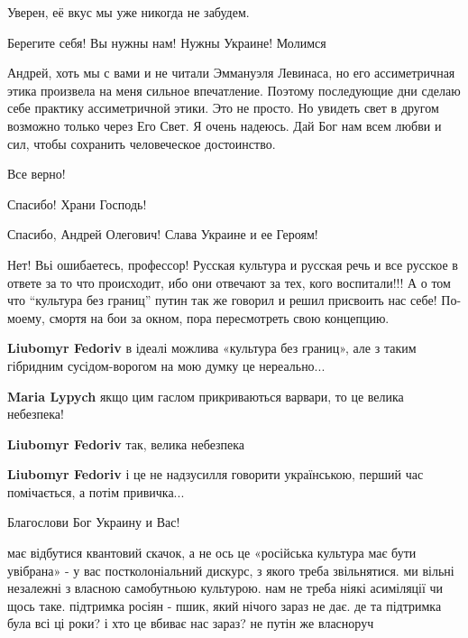 \begin{itemize}
Уверен, её вкус мы уже никогда не забудем.

Берегите себя! Вы нужны нам! Нужны Украине! Молимся


Андрей, хоть мы с вами и не читали Эммануэля Левинаса, но его ассиметричная
этика произвела на меня сильное впечатление. Поэтому последующие дни сделаю
себе практику ассиметричной этики. Это не просто. Но увидеть свет в другом
возможно только через Его Свет. Я очень надеюсь. Дай Бог нам всем любви и сил,
чтобы сохранить человеческое достоинство.

Все верно!

Спасибо! Храни Господь!

Спасибо, Андрей Олегович!
Слава Украине и ее Героям!


Нет! Вьі ошибаетесь, профессор! Русская культура и русская речь и все русское в
ответе за то что происходит, ибо они отвечают за тех, кого воспитали!!! А о том
что \enquote{культура без границ} путин так же говорил и решил присвоить нас себе!
По-моему, смортя на бои за окном, пора пересмотреть свою концепцию.

\begin{itemize} %
\textbf{Liubomyr Fedoriv} в ідеалі можлива «культура без границ», але з таким гібридним сусідом-ворогом на мою думку це нереально...

\textbf{Maria Lypych} якщо цим гаслом прикриваються варвари, то це велика небезпека!

\textbf{Liubomyr Fedoriv} так, велика небезпека

\textbf{Liubomyr Fedoriv} і це не надзусилля говорити українською, перший час помічається, а потім привичка...
\end{itemize} %

Благослови Бог Украину и Вас!


має відбутися квантовий скачок, а не ось це «російська культура має бути
увібрана» - у вас постколоніальний дискурс, з якого треба звільнятися. ми
вільні незалежні з власною самобутньою культурою. нам не треба ніякі асиміляції
чи щось таке. підтримка росіян - пшик, який нічого зараз не дає. де та
підтримка була всі ці роки? і хто це вбиває нас зараз? не путін же власноруч


\end{itemize}
